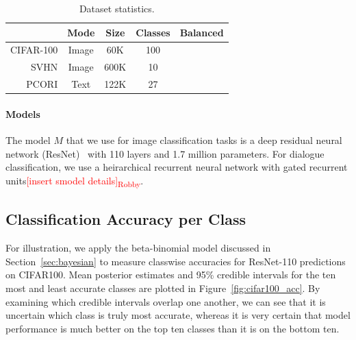 \documentclass{article}
\newcommand{\cmark}{\ding{51}}%
\newcommand{\xmark}{\ding{55}}%
\newcommand{\robby}[1]{\textcolor{Red}{[#1]\textsubscript{Robby}}}
\begin{document}
\begin{table}[t]
    \centering
    \begin{tabular}{rcccc}
        \toprule
                        & Mode  & Size  & Classes   & Balanced  \\
        \midrule
             CIFAR-100  & Image & 60K   & 100       & \cmark    \\
             SVHN       & Image & 600K  & 10        & \cmark    \\
             PCORI      & Text  & 122K  & 27        & \xmark    \\
        \bottomrule
    \end{tabular}
    \caption{Dataset statistics.}
    \label{tab:datasets}
\end{table}

\paragraph{Models}
The model $M$ that we use for image classification tasks is a deep residual neural network (ResNet)~\cite{he2016deep} with 110 layers and 1.7 million parameters.
For dialogue classification, we use a heirarchical recurrent neural network with gated recurrent units\robby{insert smodel details}.



\subsection{Classification Accuracy per Class}\label{sec:accuracy-experiment}

For illustration, we apply the beta-binomial model discussed in Section~\ref{sec:bayesian} to measure classwise accuracies for ResNet-110 predictions on CIFAR100.
Mean posterior estimates and 95\% credible intervals for the ten most and least accurate classes are plotted in Figure~\ref{fig:cifar100_acc}.
By examining which credible intervals overlap one another, we can see that it is uncertain which class is truly most accurate, whereas it is very certain that model performance is much better on the top ten classes than it is on the bottom ten.
\end{document}
